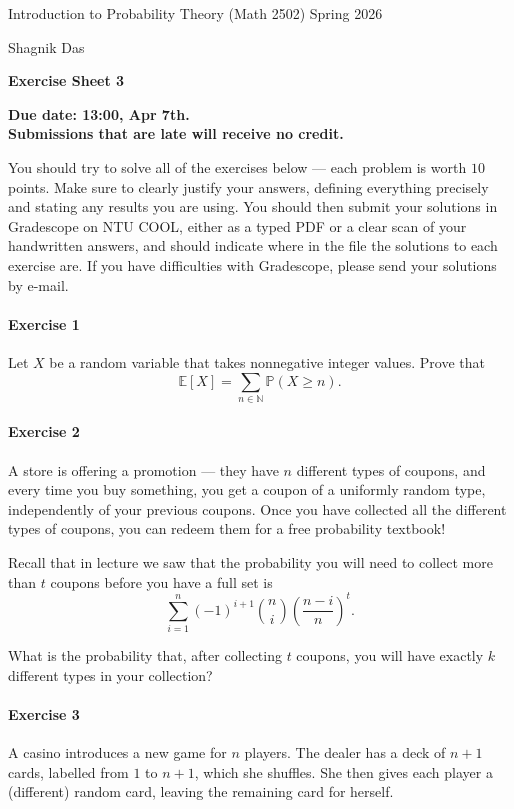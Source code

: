 \documentclass[a4paper,12pt]{article}
\newcommand{\courseTitle}{Introduction to Probability Theory (Math 2502)}
\newcommand{\semester}{Spring 2026}
\newcommand{\instructorA}{Shagnik Das}
\newcommand{\instructorB}{}
\newcommand{\sheetNumber}{3}
\newcommand{\dueDate}{13:00, Apr 7th.}
\newcommand{\lateWarning}{Submissions that are late will receive no credit.}
\newcommand{\buildtitle}[4]{
\begin{flushleft}
{\large
#1
\hfill{}
#2
\par
#3
}
\end{flushleft}
\vskip 4pt
\begin{center}
{\large\bfseries#4\par}
\end{center}
\bigskip
}
\newcommand{\mb}[1]{\mathbb{#1}}
\begin{document}
\buildtitle{\courseTitle{}}{\semester}{\instructorA{} \hfill \instructorB{}}{Exercise Sheet \sheetNumber{}}

\vspace{-0.2in}

\begin{center}

{\bf Due date: \dueDate \\ \lateWarning}

\end{center}

\noindent You should try to solve all of the exercises below --- each problem is worth $10$ points. Make sure to clearly justify your answers, defining everything precisely and stating any results you are using. You should then submit your solutions in Gradescope on NTU COOL, either as a typed PDF or a clear scan of your handwritten answers, and should indicate where in the file the solutions to each exercise are. If you have difficulties with Gradescope, please send your solutions by e-mail.

\paragraph{Exercise 1}  Let $X$ be a random variable that takes nonnegative integer values. Prove that
\[ \mb E [X] = \sum_{n \in \mathbb{N}} \mb P (X \ge n). \]

\paragraph{Exercise 2}  A store is offering a promotion --- they have $n$ different types of coupons, and every time you buy something, you get a coupon of a uniformly random type, independently of your previous coupons. Once you have collected all the different types of coupons, you can redeem them for a free probability textbook!

Recall that in lecture we saw that the probability you will need to collect more than $t$ coupons before you have a full set is
\[ \sum_{i = 1}^n (-1)^{i+1} \binom{n}{i} \left( \frac{n-i}{n} \right)^t. \]

What is the probability that, after collecting $t$ coupons, you will have exactly $k$ different types in your collection?

\paragraph{Exercise 3}  A casino introduces a new game for $n$ players. The dealer has a deck of $n+1$ cards, labelled from $1$ to $n+1$, which she shuffles. She then gives each player a (different) random card, leaving the remaining card for herself.
\end{document}
